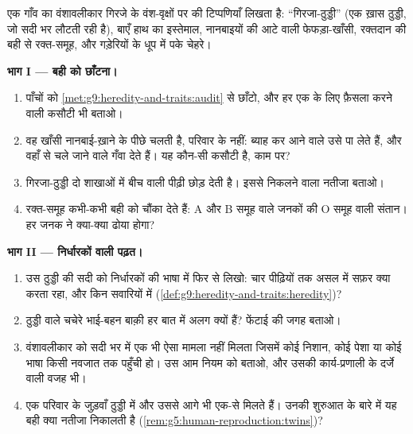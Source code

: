 \begin{problem}[{सप्ताहांत समस्या --- तीन पीढ़ियाँ, और लक्षणों की एक
बही}]\label{pb:g9:heredity-and-traits:1}
एक गाँव का वंशावलीकार गिरजे के वंश-वृक्षों पर  की टिप्पणियाँ
लिखता है: ``गिरजा-ठुड्डी'' (एक ख़ास ठुड्डी, जो सदी भर लौटती रही है),
बाएँ हाथ का इस्तेमाल, नानबाइयों की आटे वाली फेफड़ा-खाँसी, रक्तदान की बही
से रक्त-समूह, और गड़ेरियों के धूप में पके चेहरे।

\medskip\noindent\textbf{भाग I --- बही को छाँटना।}
\begin{enumerate}
  \item पाँचों  को
        \cref{met:g9:heredity-and-traits:audit} से छाँटो, और हर एक के
        लिए फ़ैसला करने वाली कसौटी भी बताओ।
  \item वह खाँसी नानबाई-ख़ाने के पीछे चलती है, परिवार के नहीं: ब्याह
        कर आने वाले उसे पा लेते हैं, और वहाँ से चले जाने वाले गँवा
        देते हैं। यह कौन-सी कसौटी है, काम पर?
  \item गिरजा-ठुड्डी दो शाखाओं में बीच वाली पीढ़ी छोड़ देती है। इससे
        निकलने वाला नतीजा बताओ।
  \item रक्त-समूह कभी-कभी बही को चौंका देते हैं: A और B समूह वाले
        जनकों की O समूह वाली संतान। हर जनक ने क्या-क्या ढोया होगा?
\end{enumerate}

\medskip\noindent\textbf{भाग II --- निर्धारकों वाली पढ़त।}
\begin{enumerate}[resume]
  \item उस ठुड्डी की सदी को निर्धारकों की भाषा में फिर से लिखो: चार
        पीढ़ियों तक असल में सफ़र क्या करता रहा, और किन सवारियों में
        (\cref{def:g9:heredity-and-traits:heredity})?
  \item ठुड्डी वाले चचेरे भाई-बहन बाक़ी हर बात में अलग क्यों हैं?
        फेंटाई की जगह बताओ।
  \item वंशावलीकार को सदी भर में एक भी ऐसा मामला नहीं मिलता जिसमें कोई
        निशान, कोई पेशा या कोई भाषा किसी नवजात तक पहुँची हो। उस आम
        नियम को बताओ, और उसकी कार्य-प्रणाली के दर्जे वाली वजह भी।
  \item एक परिवार के जुड़वाँ ठुड्डी में और उससे आगे भी एक-से मिलते
        हैं। उनकी शुरुआत के बारे में यह बही क्या नतीजा निकालती है
        (\cref{rem:g5:human-reproduction:twins})?
\end{enumerate}


\end{problem}
